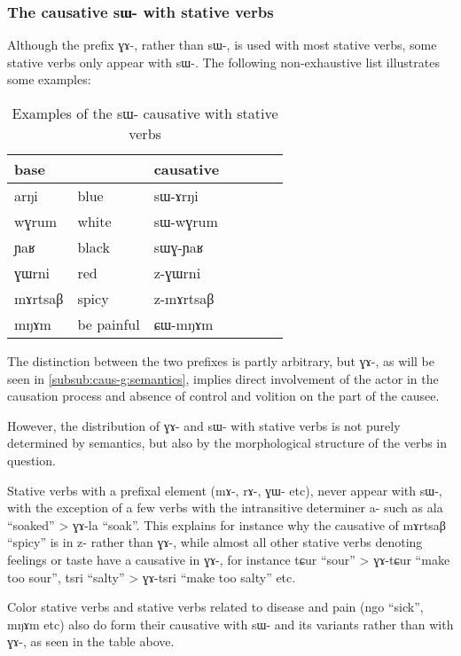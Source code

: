 \documentclass[oldfontcommands,oneside,a4paper,11pt]{memoir}
\newcommand{\ipa}[1]{{\phon #1}} %
\begin{document}
 \subsubsection{The causative \ipa{sɯ-} with stative verbs} \label{subsub:caus.sW.stative}
 Although the prefix \ipa{ɣɤ-}, rather than \ipa{sɯ-}, is used with most stative verbs, some stative verbs only appear with \ipa{sɯ-}. The following non-exhaustive list illustrates some examples:
 \begin{table}[H]
\caption{Examples of the \ipa{sɯ}- causative with stative verbs }\label{tab:causative.sW.stative}
\begin{tabular}{lllllll} \toprule
  base  & &causative  \\
\midrule
   \ipa{arŋi} & blue & \ipa{sɯ-ɤrŋi} \\
 \ipa{wɣrum} & white & \ipa{sɯ-wɣrum} \\
 \ipa{ɲaʁ} & black & \ipa{sɯɣ-ɲaʁ} \\
  \ipa{ɣɯrni} & red & \ipa{z-ɣɯrni} \\
    \ipa{mɤrtsaβ} & spicy & \ipa{z-mɤrtsaβ} \\
       \ipa{mŋɤm} & be painful & \ipa{ɕɯ-mŋɤm} \\
\bottomrule
\end{tabular}
\end{table}
   The distinction between the two prefixes is partly arbitrary, but \ipa{ɣɤ-}, as will be seen in  \ref{subsub:caus-g:semantics}, implies  direct involvement of the actor in the causation process  and absence of control and volition on the part of the causee. 
   
   However, the distribution of  \ipa{ɣɤ-} and \ipa{sɯ-} with stative verbs is not purely determined by semantics, but also by the morphological structure of the verbs in question. 
   
    Stative verbs with a prefixal element (\ipa{mɤ-}, \ipa{rɤ-}, \ipa{ɣɯ-} etc), never appear with \ipa{sɯ-}, with the exception of a few verbs with the intransitive determiner \ipa{a-} such as \ipa{ala}  ``soaked'' > \ipa{ɣɤ-la}  ``soak''. This explains for instance why the causative of \ipa{mɤrtsaβ}  ``spicy'' is  in \ipa{z-} rather than \ipa{ɣɤ-}, while almost all other stative verbs denoting feelings or taste have a causative in \ipa{ɣɤ-}, for instance \ipa{tɕur}  ``sour'' > \ipa{ɣɤ-tɕur}  ``make too sour'',   \ipa{tsri}  ``salty'' > \ipa{ɣɤ-tsri}  ``make too salty'' etc.  
  
Color stative verbs and stative verbs related to disease and pain (\ipa{ngo} ``sick'', \ipa{mŋɤm} etc) also do  form their causative with \ipa{sɯ-} and its variants rather than with \ipa{ɣɤ-}, as seen in the table above.
  
\end{document}
